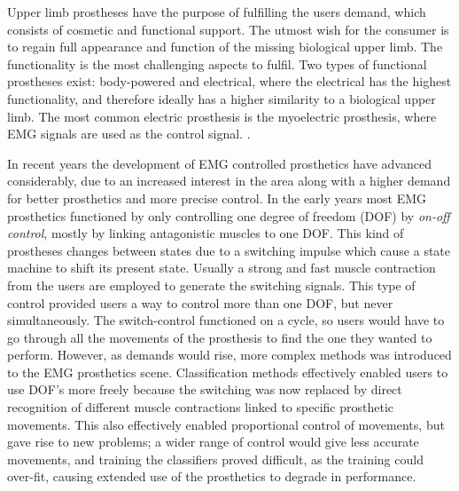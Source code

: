 
Upper limb prostheses have the purpose of fulfilling the users demand, which consists of cosmetic and functional support. The utmost wish for the consumer is to regain full appearance and function of the missing biological upper limb. The functionality is the most challenging aspects to fulfil. Two types of functional prostheses exist: body-powered and electrical, where the electrical has the highest functionality, and therefore ideally has a higher similarity to a biological upper limb. The most common electric prosthesis is the myoelectric prosthesis, where EMG signals are used as the control signal. \cite{jiang2012}. 

In recent years the development of EMG controlled prosthetics have advanced considerably, due to an increased interest in the area along with a higher demand for better prosthetics and more precise control. \cite{Fougner2012} In the early years most EMG prosthetics functioned by only controlling one degree of freedom (DOF) by \textit{on-off control}, mostly by linking antagonistic muscles to one DOF. This kind of prostheses changes between states due to a switching impulse which cause a state machine to shift its present state. Usually a strong and fast muscle contraction from the users are employed to generate the switching signals. \cite{amsuess2014}
This type of control provided users a way to control more than one DOF, but never simultaneously. The switch-control functioned on a cycle, so users would have to go through all the movements of the prosthesis to find the one they wanted to perform. However, as demands would rise, more complex methods was introduced to the EMG prosthetics scene. Classification methods effectively enabled users to use DOF's more freely because the switching was now replaced by direct recognition of different muscle contractions linked to specific prosthetic movements. This also effectively enabled proportional control of movements, but gave rise to new problems; a wider range of control would give less accurate movements, and training the classifiers proved difficult, as the training could over-fit, causing extended use of the prosthetics to degrade in performance. \cite{Ison2016}

